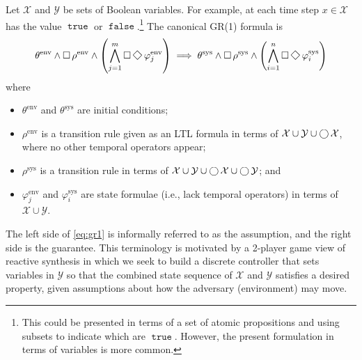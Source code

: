 \documentclass{amsart}
\DeclareMathOperator{\true}{\mathtt{true}}
\DeclareMathOperator{\false}{\mathtt{false}}
\theoremstyle{plain}
\theoremstyle{definition}
\theoremstyle{definition}
\begin{document}
Let $\mathcal{X}$ and $\mathcal{Y}$ be sets of Boolean variables.  For example,
at each time step $x\in\mathcal{X}$ has the value $\true$ or
$\false$.\footnote{This could be presented in terms of a set of atomic
  propositions and using subsets to indicate which are $\true$.  However, the
  present formulation in terms of variables is more common.}  The canonical
GR(1) formula is
\begin{equation}\label{eq:gr1}
  \theta^{\mathrm{env}} \wedge \Galways \rho^{\mathrm{env}} \wedge \left( \bigwedge_{j=1}^{m} \Galways\Feventually \varphi^{\mathrm{env}}_{j} \right) \implies \theta^{\mathrm{sys}} \wedge \Galways \rho^{\mathrm{sys}} \wedge \left( \bigwedge_{i=1}^{n} \Galways\Feventually \varphi^{\mathrm{sys}}_{i} \right)
\end{equation}
where
\begin{itemize}
\item $\theta^{\mathrm{env}}$ and $\theta^{\mathrm{sys}}$ are initial conditions;
\item $\rho^{\mathrm{env}}$ is a transition rule given as an LTL formula in terms of $\mathcal{X}\cup\mathcal{Y}\cup\operatorname{\bigcirc}\mathcal{X}$, where no other temporal operators appear;
\item $\rho^{\mathrm{sys}}$ is a transition rule in terms of $\mathcal{X}\cup\mathcal{Y}\cup\operatorname{\bigcirc}\mathcal{X}\cup\operatorname{\bigcirc}\mathcal{Y}$; and
\item $\varphi^{\mathrm{env}}_{j}$ and $\varphi^{\mathrm{sys}}_{i}$ are state formulae (i.e., lack temporal operators) in terms of $\mathcal{X}\cup\mathcal{Y}$.
\end{itemize}
The left side of \eqref{eq:gr1} is informally referred to as the assumption, and
the right side is the guarantee.  This terminology is motivated by a 2-player
game view of reactive synthesis in which we seek to build a discrete controller
that sets variables in $\mathcal{Y}$ so that the combined state sequence of
$\mathcal{X}$ and $\mathcal{Y}$ satisfies a desired property, given assumptions
about how the adversary (environment) may move.



\end{document}
